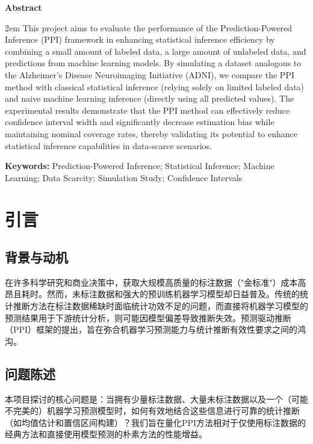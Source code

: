 \documentclass[12pt,a4paper]{article}
\begin{document}
\vspace{1em}

\clearpage
{}
{}
\begin{center}
    {\bfseries Abstract}
\end{center}
\vspace{0.5em}
\parindent 2em
\small
This project aims to evaluate the performance of the Prediction-Powered Inference (PPI) framework in enhancing statistical inference efficiency by combining a small amount of labeled data, a large amount of unlabeled data, and predictions from machine learning models. By simulating a dataset analogous to the Alzheimer's Disease Neuroimaging Initiative (ADNI), we compare the PPI method with classical statistical inference (relying solely on limited labeled data) and naive machine learning inference (directly using all predicted values). The experimental results demonstrate that the PPI method can effectively reduce confidence interval width and significantly decrease estimation bias while maintaining nominal coverage rates, thereby validating its potential to enhance statistical inference capabilities in data-scarce scenarios.

\vspace{1em}
\noindent\textbf{Keywords:} Prediction-Powered Inference; Statistical Inference; Machine Learning; Data Scarcity; Simulation Study; Confidence Intervals

\clearpage
\tableofcontents
\clearpage

\section{引言}
\subsection{背景与动机}
在许多科学研究和商业决策中，获取大规模高质量的标注数据（"金标准"）成本高昂且耗时。然而，未标注数据和强大的预训练机器学习模型却日益普及。传统的统计推断方法在标注数据稀缺时面临统计功效不足的问题，而直接将机器学习模型的预测结果用于下游统计分析，则可能因模型偏差导致推断失效。预测驱动推断（PPI）框架的提出，旨在弥合机器学习预测能力与统计推断有效性要求之间的鸿沟。

\subsection{问题陈述}
本项目探讨的核心问题是：当拥有少量标注数据、大量未标注数据以及一个（可能不完美的）机器学习预测模型时，如何有效地结合这些信息进行可靠的统计推断（如均值估计和置信区间构建）？我们旨在量化PPI方法相对于仅使用标注数据的经典方法和直接使用模型预测的朴素方法的性能增益。
\end{document}
